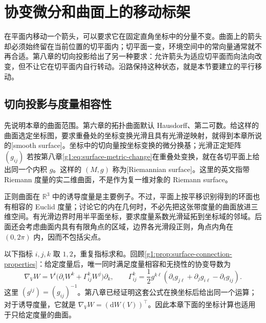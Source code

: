 
% 
% 

\section{协变微分和曲面上的移动标架}
\label{g1:sec:0901}

在平面内移动一个箭头，可以要求它在固定直角坐标中的分量不变。曲面上的箭头却必须始终留在当前位置的切平面内；切平面一变，环境空间中的常向量通常就不再合适。第八章的切向投影给出了另一种要求：允许箭头为适应切平面而向法向改变，但不让它在切平面内自行转动。沿路保持这种状态，就是本节要建立的平行移动。

\subsection{切向投影与度量相容性}
\label{g1:subsec:0901:01}

先说明本章的曲面范围。第六章的拓扑曲面默认 Hausdorff、第二可数。给这样的曲面选定坐标图，要求重叠处的坐标变换光滑且具有光滑逆映射，就得到本章所说的[smooth surface]。坐标中的切向量按坐标变换的微分换基；光滑正定矩阵 \((g_{ij})\) 若按第八章\eqref{g1:eq:surface-metric-change}在重叠处变换，就在各切平面上给出同一个内积 \(g\)。这样的 \((M,g)\) 称为[Riemannian surface]。这里的英文指带 Riemann 度量的实二维曲面，不是作为复一维对象的 Riemann surface。

\ProseParagraphBreak

正则曲面在 \(\mathbb R^3\) 中的诱导度量是主要例子。不过，平面上按平移识别得到的环面也有相容的 Euclid 度量；讨论它的内在几何时，不必先把这张带度量的曲面放进三维空间。有光滑边界时用半平面坐标，要求度量系数光滑延拓到坐标域的邻域。后面还会考虑曲面内具有有限角点的区域，边界各光滑段正则，角点内角在 \((0,2\pi)\) 内，因而不包括尖点。

\ProseParagraphBreak

以下指标 \(i,j,k\) 取 \(1,2\)，重复指标求和。回顾\cref{g1:prop:surface-connection-properties}：给定度量后，唯一同时满足度量相容和无挠性的协变导数为
\[
	\nabla_VW=V^i\bigl(\partial_iW^k+\Gamma^k_{ij}W^j\bigr)\partial_k,
	\qquad
	\Gamma^k_{ij}=\frac12g^{k\ell}(\partial_i g_{j\ell}+\partial_j g_{i\ell}-\partial_\ell g_{ij}).
\]
这里 \((g^{ij})=(g_{ij})^{-1}\)。第八章已经证明这套公式在换坐标后给出同一个运算；对于诱导度量，它就是 \(\nabla_VW=(\mathrm{d}W(V))^\top\)。因此本章下面的坐标计算也适用于只给定度量的曲面。

